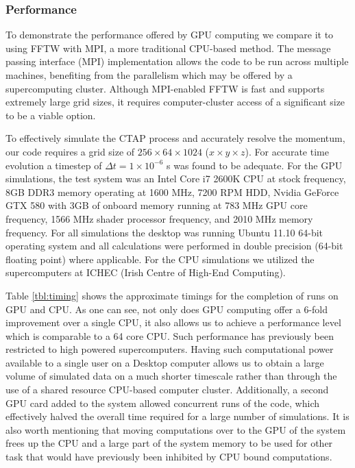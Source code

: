 \subsubsection{Performance}
To demonstrate the performance offered by GPU computing we compare it to using FFTW with MPI, a more traditional CPU-based method. The message passing interface (MPI) implementation allows the code to be run across multiple machines, benefiting from the parallelism which may be offered by a supercomputing cluster. Although MPI-enabled FFTW is fast and supports extremely large grid sizes, it requires computer-cluster access of a significant size to be a viable option. 

To effectively simulate the CTAP process and accurately resolve the momentum, our code requires a grid size of $256\times 64\times1024$ ($x\times y\times z$). For accurate time evolution a timestep of $\Delta t = 1\times 10^{-6}$ s was found to be adequate. For the GPU simulations, the test system was an Intel Core i7 2600K CPU at stock frequency, 8GB DDR3 memory operating at 1600 MHz, 7200 RPM HDD, Nvidia GeForce GTX 580 with 3GB of onboard memory running at 783 MHz GPU core frequency, 1566 MHz shader processor frequency, and 2010 MHz memory frequency. For all simulations the desktop was running Ubuntu 11.10 64-bit operating system and all calculations were performed in double precision (64-bit floating point) where applicable. For the CPU simulations we utilized the supercomputers at ICHEC (Irish Centre of High-End Computing).

Table \ref{tbl:timing} shows the approximate timings for the completion of runs on GPU and CPU. As one can see, not only does GPU computing offer a 6-fold improvement over a single CPU, it also allows us to achieve a performance level which is comparable to a 64 core CPU. Such performance has previously been restricted to high powered supercomputers. Having such computational power available to a single user on a Desktop computer allows us to obtain a large volume of simulated data on a much shorter timescale rather than through the use of a shared resource CPU-based computer cluster. Additionally, a second GPU card added to the system allowed concurrent runs of the code, which effectively halved the overall time required for a large number of simulations. It is also worth mentioning that moving computations over to the GPU of the system frees up the CPU and a large part of the system memory to be used for other task that would have previously been inhibited by CPU bound computations.

